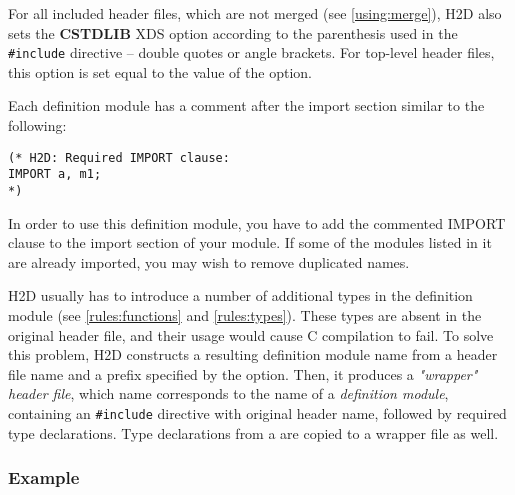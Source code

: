 For all included header files, which are not merged (see \ref{using:merge}),
H2D also sets the {\bf CSTDLIB} XDS option according to the parenthesis
used in the \verb'#include' directive -- double quotes or angle brackets.
For top-level header files, this option is set equal to the value of the
 option.

\ifcomment %

Each definition module has a comment after the import section
similar to the following:

\begin{verbatim}
(* H2D: Required IMPORT clause:
IMPORT a, m1;
*)
\end{verbatim}

In order to use this definition module, you have to add the
commented IMPORT clause to the import section of your module.
If some of the modules listed in it are already imported, you
may wish to remove duplicated names.

\fi

H2D usually has to introduce a number of additional types in the
definition module (see \ref{rules:functions} and \ref{rules:types}).
These types are absent in the original header file, and their usage would
cause C compilation to fail. To solve this problem, H2D constructs
a resulting definition module name from a header file name and a
prefix specified by the  option.
Then, it produces a {\em "wrapper" header file}, which name
corresponds to the name of a {\em definition module}, containing
an \verb'#include' directive with original header name, followed by
required type declarations. Type declarations from a \ProjectFile{}
are copied to a wrapper file as well.

\subsubsection*{Example}

